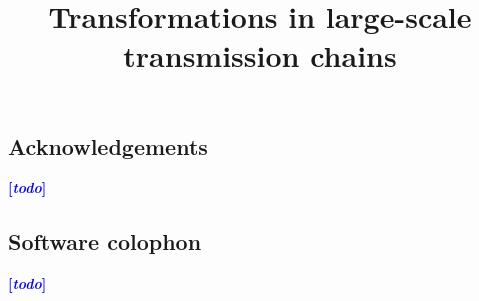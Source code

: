 \documentclass[jou]{apa6}
\title{Transformations in large-scale transmission chains}
\date{}
\newcommand{\tb}[1]{\textcolor{blue}{#1}}
\newcommand{\rk}[1]{\tb{{\footnotesize {\bf[\emph{#1}]}}}}
\begin{document}
\maketitle







\subsection*{Acknowledgements}
\rk{todo}

\subsection*{Software colophon}
\rk{todo}

\printbibliography
\end{document}
